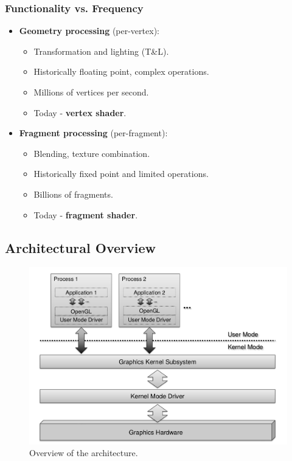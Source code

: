 \documentclass[11pt]{article}
\begin{document}
\subsubsection{Functionality vs. Frequency}
\begin{itemize}
  \item \textbf{Geometry processing} (per-vertex):
    \begin{itemize}
      \item Transformation and lighting (T\&L).
      \item Historically floating point, complex operations.
      \item Millions of vertices per second.
      \item Today - \textbf{vertex shader}.
    \end{itemize}
  \item \textbf{Fragment processing} (per-fragment):
    \begin{itemize}
      \item Blending, texture combination.
      \item Historically fixed point and limited operations.
      \item Billions of fragments.
      \item Today - \textbf{fragment shader}.
    \end{itemize}
\end{itemize}

\subsection{Architectural Overview}
\begin{figure}[htb!]
  \centering
  \caption{Overview of the architecture.}
  \includegraphics[scale=0.3]{architecture}
\end{figure}
\end{document}
